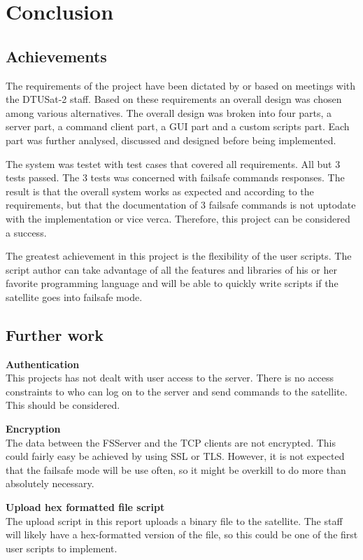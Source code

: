 \chapter{Conclusion}
\label{chap:conclusion}

\section{Achievements}
The requirements of the project have been dictated by or based on meetings with the DTUSat-2 staff. Based on these requirements an overall design was chosen among various alternatives. The overall design was broken into four parts, a server part, a command client part, a GUI part and a custom scripts part. Each part was further analysed, discussed and designed before being implemented.

The system was testet with test cases that covered all requirements. All but 3 tests passed. The 3 tests was concerned with failsafe commands responses. The result is that the overall system works as expected and according to the requirements, but that the documentation of 3 failsafe commands is not uptodate with the implementation or vice verca. Therefore, this project can be considered a success.

The greatest achievement in this project is the flexibility of the user scripts. The script author can take advantage of all the features and libraries of his or her favorite programming language and will be able to quickly write scripts if the satellite goes into failsafe mode.

\section{Further work}
\textbf{Authentication} \\
This projects has not dealt with user access to the server. There is no access constraints to who can log on to the server and send commands to the satellite. This should be considered.

\textbf{Encryption} \\
The data between the FSServer and the TCP clients are not encrypted. This could fairly easy be achieved by using SSL or TLS. However, it is not expected that the failsafe mode will be use often, so it might be overkill to do more than absolutely necessary.

\textbf{Upload hex formatted file script} \\
The upload script in this report uploads a binary file to the satellite. The staff will likely have a hex-formatted version of the file, so this could be one of the first user scripts to implement.

